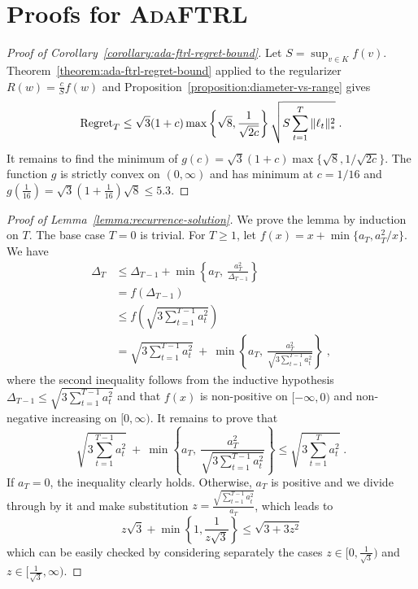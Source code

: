 \section{Proofs for \textsc{AdaFTRL}}
\label{section:ada-ftrl-proofs}

\begin{proof}[Proof of Corollary~\ref{corollary:ada-ftrl-regret-bound}]
Let $S = \sup_{v \in K} f(v)$. Theorem~\ref{theorem:ada-ftrl-regret-bound}
applied to the regularizer $R(w) = \frac{c}{S} f(w)$ and
Proposition~\ref{proposition:diameter-vs-range} gives
$$
\operatorname{Regret}_T \le \sqrt{3}(1 + c) \max\left\{\sqrt{8}, \frac{1}{\sqrt{2c}} \right\} \sqrt{S \sum_{t=1}^T \|\ell_t\|_*^2} \; .
$$
It remains to find the minimum of $g(c) = \sqrt{3}(1 + c) \max\{\sqrt{8},
1/\sqrt{2c}\}$.  The function $g$ is strictly convex on $(0, \infty)$ and has
minimum at $c=1/16$ and $g(\frac{1}{16}) = \sqrt{3}(1+\frac{1}{16})\sqrt{8} \le
5.3$.
\end{proof}

\begin{proof}[Proof of Lemma~\ref{lemma:recurrence-solution}]
We prove the lemma by induction on $T$.  The base case $T=0$ is trivial.
For $T \ge 1$, let $f(x) = x + \min\{a_T, a_T^2/x\}$. We have
\begin{align*}
\Delta_T
& \le \Delta_{T-1} + \min \left\{a_T, \ \frac{a_T^2}{\Delta_{T-1}} \right\} \\
& = f \left( \Delta_{T-1} \right) \\
& \le f \left( \sqrt{3 \sum_{t=1}^{T-1} a_t^2} \right) \\
& = \sqrt{3 \sum_{t=1}^{T-1} a_t^2} \ + \ \min \left\{ a_T, \ \frac{a_T^2}{\sqrt{3 \sum_{t=1}^{T-1} a_t^2}} \right\}  \; ,
\end{align*}
where the second inequality follows from the inductive hypothesis $\Delta_{T-1} \le
\sqrt{3 \sum_{t=1}^{T-1} a_t^2}$ and that $f(x)$ is non-positive on $[-\infty,
0)$ and non-negative increasing on $[0,\infty)$. It remains to prove that
$$
\sqrt{3 \sum_{t=1}^{T-1} a_t^2} \ + \ \min \left\{ a_T, \ \frac{a_T^2}{\sqrt{3 \sum_{t=1}^{T-1} a_t^2}} \right\}
\le  \sqrt{3 \sum_{t=1}^T a_t^2} \; .
$$
If $a_T = 0$, the inequality clearly holds. Otherwise, $a_T$ is positive and we
divide through by it and make substitution $z=\frac{\sqrt{\sum_{t=1}^{T-1}
a_t^2}}{a_T}$, which leads to
$$
z\sqrt{3} + \min\left\{1, \frac{1}{z\sqrt{3}}\right\} \le \sqrt{3 + 3z^2}
$$
which can be easily checked by considering separately the cases $z \in
[0,\frac{1}{\sqrt{3}})$ and $z \in [\frac{1}{\sqrt{3}}, \infty)$.
\end{proof}
